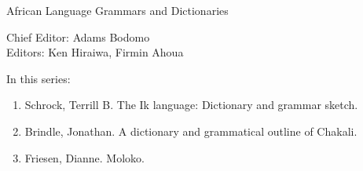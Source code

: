 {\large African Language Grammars and Dictionaries}

\bigskip

Chief Editor:    Adams Bodomo \\
Editors:    Ken Hiraiwa,    Firmin Ahoua 

\bigskip

In this series:

\begin{enumerate}
\item Schrock, Terrill B. The Ik language: Dictionary and grammar sketch.
\item Brindle, Jonathan. A dictionary and grammatical outline of Chakali.
\item Friesen, Dianne. Moloko.
\end{enumerate}


\vfill

